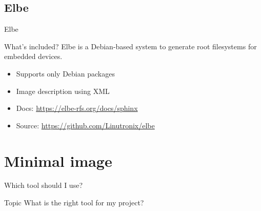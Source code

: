 \documentclass{beamer}
\begin{document}
\subsection{Elbe}

\begin{frame}{Elbe}
	\begin{block}{What's included?} 
		Elbe is a Debian-based system to generate root filesystems for embedded devices.
	\end{block}

	\begin{itemize}
		\item Supports only Debian packages
		\item Image description using XML
		\item Docs: \url{https://elbe-rfs.org/docs/sphinx}
		\item Source: \url{https://github.com/Linutronix/elbe}
	\end{itemize}
\end{frame}

\section{Minimal image}

\begin{frame}{Which tool should I use?}
	\begin{block}{Topic}
		What is the right tool for my project?
	\end{block}
\end{frame}
\end{document}
